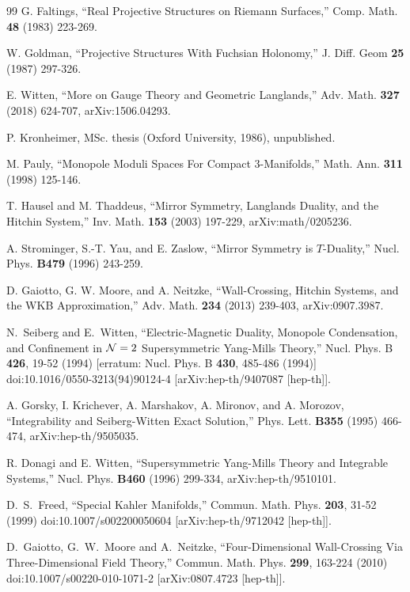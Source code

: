 \begin{thebibliography}{99}
G. Faltings, ``Real Projective Structures on Riemann Surfaces,'' Comp. Math. {\bf 48} (1983) 223-269.

W. Goldman, ``Projective Structures With Fuchsian Holonomy,'' J. Diff. Geom {\bf 25} (1987) 297-326.

E. Witten, ``More on Gauge Theory and Geometric Langlands,'' Adv. Math. {\bf 327} (2018) 624-707, arXiv:1506.04293.

P. Kronheimer, MSc. thesis (Oxford University, 1986), unpublished.


 M. Pauly, ``Monopole Moduli Spaces For Compact 3-Manifolds,''
Math. Ann. {\bf 311} (1998) 125-146.

T. Hausel and M. Thaddeus, ``Mirror Symmetry, Langlands Duality, and the Hitchin System,'' Inv. Math. {\bf 153} (2003) 197-229,
arXiv:math/0205236.

 A. Strominger, S.-T. Yau, and E. Zaslow, ``Mirror Symmetry is $T$-Duality,''
Nucl. Phys. {\bf B479} (1996) 243-259.

D. Gaiotto, G. W.  Moore, and A. Neitzke, ``Wall-Crossing, Hitchin Systems, and the WKB Approximation,'' Adv. Math. {\bf 234} (2013) 239-403, arXiv:0907.3987.



N.~Seiberg and E.~Witten,
``Electric-Magnetic Duality, Monopole Condensation, and Confinement in ${\mathcal N}=2$ Supersymmetric Yang-Mills Theory,''
Nucl. Phys. B \textbf{426}, 19-52 (1994)
[erratum: Nucl. Phys. B \textbf{430}, 485-486 (1994)]
doi:10.1016/0550-3213(94)90124-4
[arXiv:hep-th/9407087 [hep-th]].

A. Gorsky, I. Krichever, A. Marshakov, A. Mironov, and A. Morozov, ``Integrability and Seiberg-Witten Exact Solution,''  Phys. Lett. {\bf B355} (1995) 466-474,
arXiv:hep-th/9505035.

R. Donagi and E. Witten, ``Supersymmetric Yang-Mills Theory and Integrable Systems,'' Nucl. Phys. {\bf B460} (1996) 299-334, arXiv:hep-th/9510101.

D.~S.~Freed,
``Special Kahler Manifolds,''
Commun. Math. Phys. \textbf{203}, 31-52 (1999)
doi:10.1007/s002200050604
[arXiv:hep-th/9712042 [hep-th]].

D.~Gaiotto, G.~W.~Moore and A.~Neitzke,
``Four-Dimensional Wall-Crossing Via Three-Dimensional Field Theory,''
Commun. Math. Phys. \textbf{299}, 163-224 (2010)
doi:10.1007/s00220-010-1071-2
[arXiv:0807.4723 [hep-th]].



\end{thebibliography}
